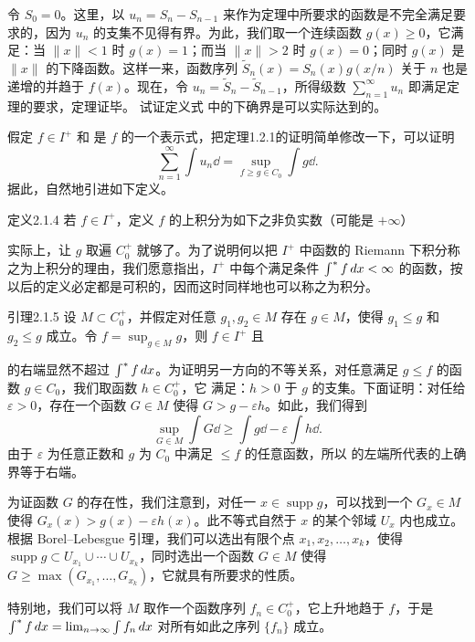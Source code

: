 令 $S_0=0$。这里，以 $u_n=S_n-S_{n-1}$ 来作为定理中所要求的函数是不完全满足要求的，因为 $u_n$ 的支集不见得有界。为此，我们取一个连续函数 $g(x)\ge0$，它满足：当 $\|x\|<1$ 时 $g(x)=1$；而当 $\|x\|>2$ 时 $g(x)=0$；同时 $g(x)$ 是 $\|x\|$ 的下降函数。这样一来，函数序列 $\widetilde S_n(x)=S_n(x)g(x/n)$ 关于 $n$ 也是递增的并趋于 $f(x)$。现在，令 $u_n=\widetilde S_n-\widetilde S_{n-1}$，所得级数 $\sum_{n=1}^\infty u_n$ 即满足定理的要求，定理证毕。
\Exercise 试证定义式  中的下确界是可以实际达到的。

假定 $f\in I^+$ 和  是 $f$ 的一个表示式，把定理1.2.1的证明简单修改一下，可以证明
\[\sum_{n=1}^\infty\int u_n\dd=\sup_{f\ge g\in C_0}\int g\dd.\]
据此，自然地引进如下定义。
\begin{statement}{定义}{2.1.4}
若 $f\in I^+$，定义 $f$ 的上积分为如下之非负实数（可能是 $+\infty$）
\end{statement}
实际上，让 $g$ 取遍 $C_0^+$ 就够了。为了说明何以把 $I^+$ 中函数的 Riemann 下积分称之为上积分的理由，我们愿意指出，$I^+$ 中每个满足条件 $\int^{*} f\,dx<\infty$ 的函数，按以后的定义必定都是可积的，因而这时同样地也可以称之为积分。
\begin{statement}{引理}{2.1.5}
设 $M\subset C_0^+$，并假定对任意 $g_1,g_2\in M$ 存在 $g\in M$，使得 $g_1\le g$ 和 $g_2\le g$ 成立。令 $f=\sup_{g\in M}g$，则 $f\in I^+$ 且
\end{statement}
\Proof {} 的右端显然不超过 $\int^{*} f\,dx$。为证明另一方向的不等关系，对任意满足 $g\le f$ 的函数 $g\in C_0$，我们取函数 $h\in C_0^+$，它
满足：$h>0$ 于 $g$ 的支集。下面证明：对任给 $\varepsilon>0$，存在一个函数 $G\in M$ 使得 $G>g-\varepsilon h$。如此，我们得到
\[\sup_{G\in M}\int G\dd\ge\int g\dd-\varepsilon\int h\dd.\]
由于 $\varepsilon$ 为任意正数和 $g$ 为 $C_0$ 中满足 $\le f$ 的任意函数，所以  的左端所代表的上确界等于右端。

为证函数 $G$ 的存在性，我们注意到，对任一 $x\in\operatorname{supp}g$，可以找到一个 $G_x\in M$ 使得 $G_x(x)>g(x)-\varepsilon h(x)$。此不等式自然于 $x$ 的某个邻域 $U_x$ 内也成立。根据 Borel--Lebesgue 引理，我们可以选出有限个点 $x_1,x_2,\ldots,x_k$，使得 $\operatorname{supp}g\subset U_{x_1}\cup\cdots\cup U_{x_k}$，同时选出一个函数 $G\in M$ 使得 $G\ge\max(G_{x_1},\ldots,G_{x_k})$，它就具有所要求的性质。

特别地，我们可以将 $M$ 取作一个函数序列 $f_n\in C_0^+$，它上升地趋于 $f$，于是 $\int^{*} f\,dx=\lim_{n\to\infty}\int f_n\,dx$ 对所有如此之序列 $\{f_n\}$ 成立。

